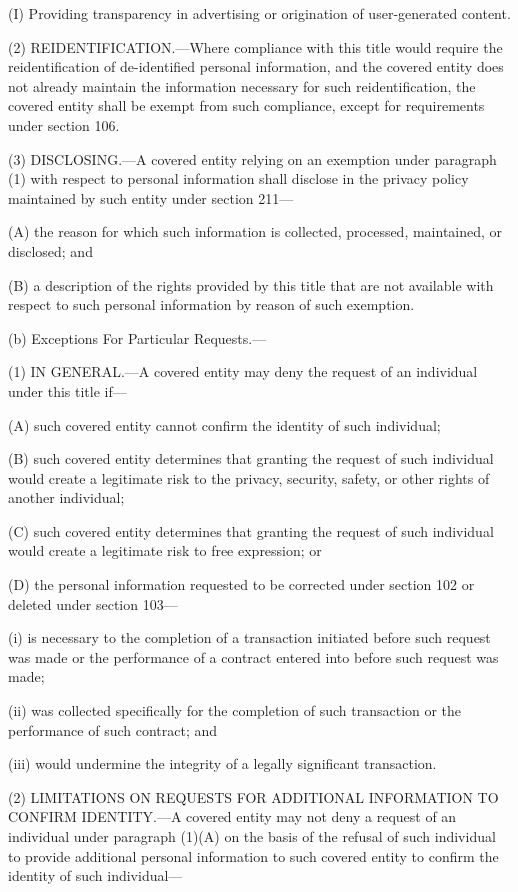 (I) Providing transparency in advertising or origination of user-generated content.

(2) REIDENTIFICATION.—Where compliance with this title would require the reidentification of de-identified personal information, and the covered entity does not already maintain the information necessary for such reidentification, the covered entity shall be exempt from such compliance, except for requirements under section 106.

(3) DISCLOSING.—A covered entity relying on an exemption under paragraph (1) with respect to personal information shall disclose in the privacy policy maintained by such entity under section 211—

(A) the reason for which such information is collected, processed, maintained, or disclosed; and

(B) a description of the rights provided by this title that are not available with respect to such personal information by reason of such exemption.

(b) Exceptions For Particular Requests.—

(1) IN GENERAL.—A covered entity may deny the request of an individual under this title if—

(A) such covered entity cannot confirm the identity of such individual;

(B) such covered entity determines that granting the request of such individual would create a legitimate risk to the privacy, security, safety, or other rights of another individual;

(C) such covered entity determines that granting the request of such individual would create a legitimate risk to free expression; or

(D) the personal information requested to be corrected under section 102 or deleted under section 103—

(i) is necessary to the completion of a transaction initiated before such request was made or the performance of a contract entered into before such request was made;

(ii) was collected specifically for the completion of such transaction or the performance of such contract; and

(iii) would undermine the integrity of a legally significant transaction.

(2) LIMITATIONS ON REQUESTS FOR ADDITIONAL INFORMATION TO CONFIRM IDENTITY.—A covered entity may not deny a request of an individual under paragraph (1)(A) on the basis of the refusal of such individual to provide additional personal information to such covered entity to confirm the identity of such individual—

